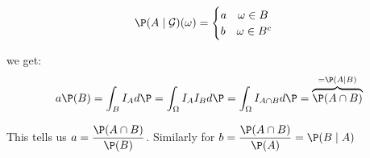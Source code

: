 \begin{equation*}
  \begin{gathered}
    \P(A\mid\mathcal{G})(\omega)= \begin{cases}a\quad \omega\in B\\ b\quad\omega\in B^c\end{cases}
  \end{gathered}
\end{equation*}\par
\noindent we get:
\begin{equation*}
  \begin{gathered}
    a\P(B) = \int_B I_A d\P = \int_\Omega I_AI_Bd\P = \int_\Omega I_{A\cap B} d\P = \overbrace{\P(A\cap B)}^{=\P(A\mid B)}
  \end{gathered}
\end{equation*}\par
\noindent This tells us $a = \dfrac{\P(A\cap B)}{\P(B)}$. Similarly for $b = \dfrac{\P(A\cap B)}{\P(A)} = \P(B\mid A)$
\par\bigskip
